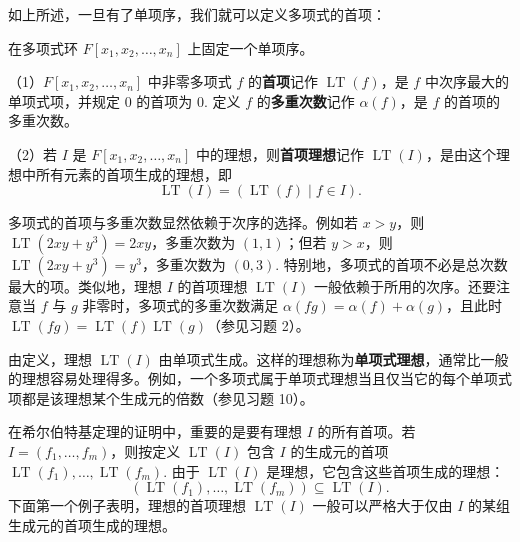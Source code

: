 如上所述，一旦有了单项序，我们就可以定义多项式的首项：

\begin{definition}
在多项式环 \(F[x_1, x_2, \ldots, x_n]\) 上固定一个单项序。

（1）\(F[x_1, x_2, \ldots, x_n]\) 中非零多项式 \(f\) 的\textbf{首项}记作 \(\operatorname{LT}(f)\)，是 \(f\) 中次序最大的单项式项，并规定 0 的首项为 0. 定义 \(f\) 的\textbf{多重次数}记作 \(\alpha(f)\)，是 \(f\) 的首项的多重次数。

（2）若 \(I\) 是 \(F[x_1, x_2, \ldots, x_n]\) 中的理想，则\textbf{首项理想}记作 \(\operatorname{LT}(I)\)，是由这个理想中所有元素的首项生成的理想，即
\[
\operatorname{LT}(I) = (\operatorname{LT}(f) \mid f \in I).
\]
\end{definition}

多项式的首项与多重次数显然依赖于次序的选择。例如若 \(x > y\)，则 \(\operatorname{LT}(2xy+y^3) = 2xy\)，多重次数为 \((1,1)\)；但若 \(y > x\)，则 \(\operatorname{LT}(2xy+y^3) = y^3\)，多重次数为 \((0,3)\). 特别地，多项式的首项不必是总次数最大的项。类似地，理想 \(I\) 的首项理想 \(\operatorname{LT}(I)\) 一般依赖于所用的次序。还要注意当 \(f\) 与 \(g\) 非零时，多项式的多重次数满足 \(\alpha(fg) = \alpha(f)+\alpha(g)\)，且此时 \(\operatorname{LT}(fg) = \operatorname{LT}(f)\operatorname{LT}(g)\)（参见习题 2）。

由定义，理想 \(\operatorname{LT}(I)\) 由单项式生成。这样的理想称为\textbf{单项式理想}，通常比一般的理想容易处理得多。例如，一个多项式属于单项式理想当且仅当它的每个单项式项都是该理想某个生成元的倍数（参见习题 10）。

在希尔伯特基定理的证明中，重要的是要有理想 \(I\) 的所有首项。若 \(I = (f_1, \ldots, f_m)\)，则按定义 \(\operatorname{LT}(I)\) 包含 \(I\) 的生成元的首项 \(\operatorname{LT}(f_1), \ldots, \operatorname{LT}(f_m)\). 由于 \(\operatorname{LT}(I)\) 是理想，它包含这些首项生成的理想：
\[
(\operatorname{LT}(f_1), \ldots, \operatorname{LT}(f_m)) \subseteq \operatorname{LT}(I).
\]
下面第一个例子表明，理想的首项理想 \(\operatorname{LT}(I)\) 一般可以严格大于仅由 \(I\) 的某组生成元的首项生成的理想。

